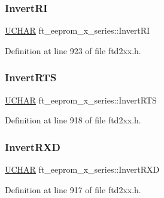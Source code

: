 \subsubsection{\texorpdfstring{Invert\+RI}{InvertRI}}
{\footnotesize\ttfamily \hyperlink{CatCaloProto40MHz_2inc_2WinTypes_8h_a4f4bb67531a9bf6f0b9c6ad76aeba587}{U\+C\+H\+AR} ft\+\_\+eeprom\+\_\+x\+\_\+series\+::\+Invert\+RI}



Definition at line 923 of file ftd2xx.\+h.

\mbox{\label{structft__eeprom__x__series_ad91ce924b72723ca294cc88da678f85d}} 
\subsubsection{\texorpdfstring{Invert\+R\+TS}{InvertRTS}}
{\footnotesize\ttfamily \hyperlink{CatCaloProto40MHz_2inc_2WinTypes_8h_a4f4bb67531a9bf6f0b9c6ad76aeba587}{U\+C\+H\+AR} ft\+\_\+eeprom\+\_\+x\+\_\+series\+::\+Invert\+R\+TS}



Definition at line 918 of file ftd2xx.\+h.

\mbox{\label{structft__eeprom__x__series_a01ecab15eacb417a6e5897f8d09fb585}} 
\subsubsection{\texorpdfstring{Invert\+R\+XD}{InvertRXD}}
{\footnotesize\ttfamily \hyperlink{CatCaloProto40MHz_2inc_2WinTypes_8h_a4f4bb67531a9bf6f0b9c6ad76aeba587}{U\+C\+H\+AR} ft\+\_\+eeprom\+\_\+x\+\_\+series\+::\+Invert\+R\+XD}



Definition at line 917 of file ftd2xx.\+h.

\mbox{\label{structft__eeprom__x__series_a62798961d771e89afc6d573f83ddfe20}} 
